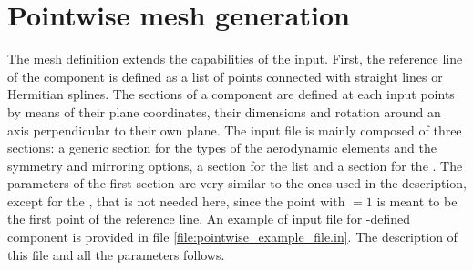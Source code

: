 \section{Pointwise mesh generation}
\label{sec:Pointwise_mesh_generation}
%
The  mesh definition extends the capabilities of the  input. 
First, the reference line of the component is defined as a list of points connected with straight 
lines or Hermitian splines. The sections of a component are defined at each input points by means 
of their plane coordinates, their dimensions and rotation around an axis perpendicular to their own plane.
%
The input file is mainly composed of three sections: a generic section for the types of the 
aerodynamic elements and the symmetry and mirroring options, a section for the  
list and a section for the . The parameters of the first section are very similar 
to the ones used in the  description, except for the , 
that is not needed here, since the point with $=1$ is meant to be the first point of 
the reference line.
\newline \noindent
%
An example of input file for -defined component is provided in file 
\ref{file:pointwise_example_file.in}. The description of this file and all the parameters follows.
%

